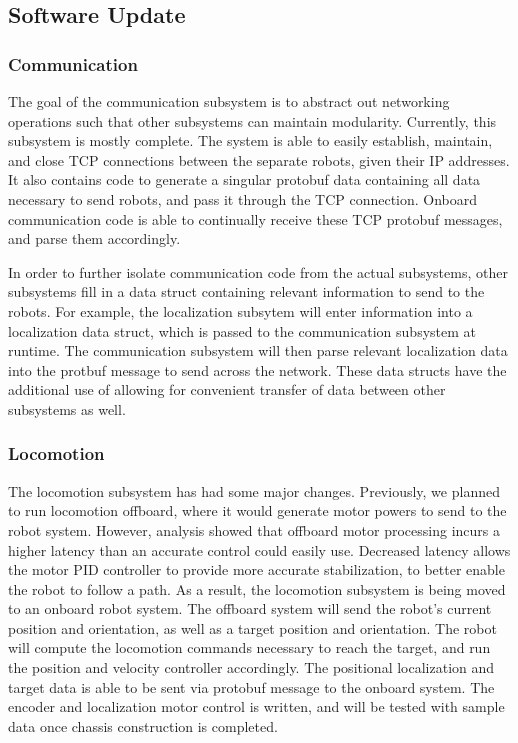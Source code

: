 \subsection{Software Update}
\label{sec:software_progress}

\subsubsection{Communication}
The goal of the communication subsystem is to abstract out networking operations such that other subsystems can maintain modularity. Currently, this subsystem is mostly complete. The system is able to easily establish, maintain, and close TCP connections between the separate robots, given their IP addresses. It also contains code to generate a singular protobuf data containing all data necessary to send robots, and pass it through the TCP connection. Onboard communication code is able to continually receive these TCP protobuf messages, and parse them accordingly.

In order to further isolate communication code from the actual subsystems, other subsystems fill in a data struct containing relevant information to send to the robots. For example, the localization subsytem will enter information into a localization data struct, which is passed to the communication subsystem at runtime. The communication subsystem will then parse relevant localization data into the protbuf message to send across the network. These data structs have the additional use of allowing for convenient transfer of data between other subsystems as well.

\subsubsection{Locomotion}
The locomotion subsystem has had some major changes. Previously, we planned to run locomotion offboard, where it would generate motor powers to send to the robot system. However, analysis showed that offboard motor processing incurs a higher latency than an accurate control could easily use. Decreased latency allows the motor PID controller to provide more accurate stabilization, to better enable the robot to follow a path. As a result, the locomotion subsystem is being moved to an onboard robot system. The offboard system will send the robot's current position and orientation, as well as a target position and orientation. The robot will compute the locomotion commands necessary to reach the target, and run the position and velocity controller accordingly. The positional localization and target data is able to be sent via protobuf message to the onboard system. The encoder and localization motor control is written, and will be tested with sample data once chassis construction is completed.

